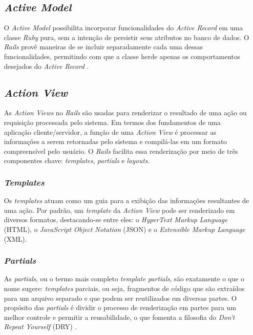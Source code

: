 \subsection{\textit{Active Model}}

O \textit{Active Model} possibilita incorporar funcionalidades do \textit{Active Record} em uma classe \textit{Ruby} pura, sem a intenção de persistir seus atributos no banco de dados. O \textit{Rails} provê maneiras de se incluir separadamente cada uma dessas funcionalidades, permitindo com que a classe herde apenas os comportamentos desejados do \textit{Active Record} \cite{activemodel-basics}.

\subsection{\textit{Action View}}

As \textit{Action Views} no \textit{Rails} são usadas para renderizar o resultado de uma ação ou requisição processada pelo sistema. Em termos dos fundamentos de uma aplicação cliente/servidor, a função de uma \textit{Action View} é processar as informações a serem retornadas pelo sistema e compilá-las em um formato compreensível pelo usuário. O \textit{Rails} facilita essa renderização por meio de três componentes chave: \textit{templates}, \textit{partials} e \textit{layouts}.

\subsubsection{\textit{Templates}}

Os \textit{templates} atuam como um guia para a exibição das informações resultantes de uma ação. Por padrão, um \textit{template} da \textit{Action View} pode ser renderizado em diversos formatos, destacando-se entre eles: o \textit{HyperText Markup Language} (HTML), o \textit{JavaScript Object Notation} (JSON) e o \textit{Extensible Markup Language} (XML).

\subsubsection{\textit{Partials}}

As \textit{partials}, ou o termo mais completo \textit{template partials}, são exatamente o que o nome sugere: \textit{templates} parciais, ou seja, fragmentos de código que são extraídos para um arquivo separado e que podem ser reutilizados em diversas partes. O propósito das \textit{partials} é dividir o processo de renderização em partes para um melhor controle e permitir a reusabilidade, o que fomenta a filosofia do \textit{Don't Repeat Yourself} (DRY) \cite{actionview-overview}.

